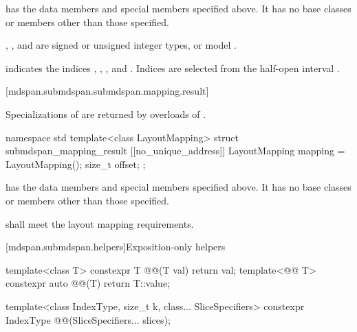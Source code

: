\pnum
{} has the data members and special members specified above.
It has no base classes or members other than those specified.

\pnum
\mandates
{}, , and 
are signed or unsigned integer types, or
model .
\begin{note}
indicates the indices , , , and .
Indices are selected from the half-open interval .
\end{note}

[mdspan.submdspan.submdspan.mapping.result]{}

\pnum
Specializations of 
are returned by overloads of .

%
\begin{codeblock}
namespace std {
  template<class LayoutMapping>
  struct submdspan_mapping_result {
    [[no_unique_address]] LayoutMapping mapping = LayoutMapping();
    size_t offset{};
  };
}
\end{codeblock}

\pnum
{} has
the data members and special members specified above.
It has no base classes or members other than those specified.

\pnum
{} shall meet
the layout mapping requirements.

[mdspan.submdspan.helpers]{Exposition-only helpers}

%
%
\begin{itemdecl}
template<class T>
  constexpr T @@(T val) { return val; }
template<@@ T>
  constexpr auto @@(T) { return T::value; }

template<class IndexType, size_t k, class... SliceSpecifiers>
  constexpr IndexType @@(SliceSpecifiers... slices);
\end{itemdecl}

